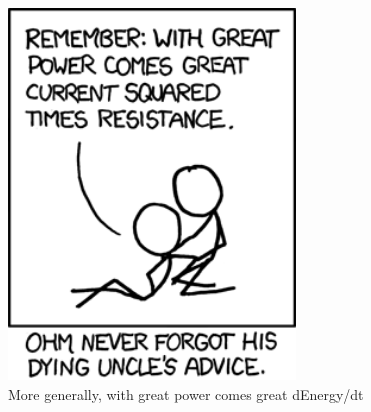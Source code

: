 \documentclass[letterpaper,12pt]{article}
\begin{document}
\begin{figure}[ht!]
	\centering
	\includegraphics[width=3in]{ohm.png}
   \caption*{More generally, with great power comes great dEnergy/dt}
\end{figure}
\end{document}
